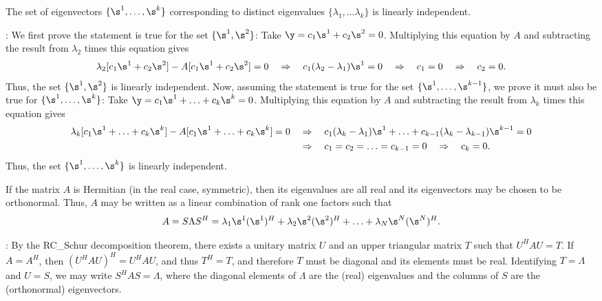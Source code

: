 \begin{fact} \label{fact.A.D.D.A}
The set of eigenvectors $\{\s^{1},\ldots,\s^{k}\}$ corresponding to
distinct eigenvalues $\{\lambda_{1},\ldots\lambda_{k}\}$ is linearly
independent.
\end{fact}

\/: We first prove the statement
is true for the set $\{\s^{1},\s^{2}\}$: Take
$\y=c_{1}\s^{1}+c_{2}\s^{2}=0$.  Multiplying this equation by $A$ and
subtracting the result from $\lambda_{2}$ times this equation gives
\begin{equation*}
    \lambda_{2}[c_{1}\s^{1}+c_{2}\s^{2}] - A[c_{1}\s^{1}+c_{2}\s^{2}] =0 \quad \Rightarrow \quad
    c_{1} (\lambda_{2}-\lambda_{1}) \s^{1} = 0 \quad \Rightarrow \quad c_{1}=0 \quad \Rightarrow \quad c_{2}=0.
\end{equation*}
Thus, the set $\{\s^{1},\s^{2}\}$ is linearly independent.  Now,
assuming the statement is true for the set
$\{\s^{1},\ldots,\s^{k-1}\}$, we prove it must also be true for
$\{\s^{1},\ldots,\s^{k}\}$: Take
$\y=c_{1}\s^{1}+\ldots+c_{k}\s^{k}=0$.  Multiplying this equation by
$A$ and subtracting the result from $\lambda_{k}$ times this equation
gives
\begin{align*}
    \lambda_{k}[c_{1}\s^{1}+\ldots+c_{k}\s^{k}] -
    A[c_{1}\s^{1}+\ldots+c_{k}\s^{k}] =0 \quad &\Rightarrow \quad c_{1}
    (\lambda_{k}-\lambda_{1}) \s^{1} + \ldots + c_{k-1}
    (\lambda_{k}-\lambda_{k-1}) \s^{k-1} = 0 \\ &\Rightarrow \quad
    c_{1}=c_{2}=\ldots=c_{k-1}=0 \quad \Rightarrow \quad c_{k}=0.
\end{align*}
Thus, the set $\{\s^{1},\ldots,\s^{k}\}$ is linearly independent. \endproof

\begin{fact} \label{fact.A.D.D.B}
If the matrix $A$ is Hermitian (in the real case,
symmetric), then its eigenvalues are all real and its eigenvectors may be
chosen to be orthonormal.  Thus, $A$ may be written as a linear combination of rank one
factors such that
\begin{equation*}
A=S\Lambda S^H = \lambda_1 \s^1 (\s^1)^H + \lambda_2 \s^2 (\s^2)^H + \ldots + \lambda_N \s^N (\s^N)^H.
\end{equation*}
\end{fact}

\/: By the RC_Schur decomposition theorem, there
exists a unitary matrix $U$ and an upper triangular matrix $T$ such
that $U^{H}AU=T$.  If $A=A^{H}$, then $(U^{H}AU)^{H}=U^{H}AU$, and
thus $T^{H}=T$, and therefore $T$ must be diagonal and its elements
must be real.  Identifying $T=\Lambda$ and $U=S$, we may write
$S^{H}A S=\Lambda$, where the diagonal elements of $\Lambda$ are the
(real) eigenvalues and the columns of $S$ are the (orthonormal)
eigenvectors.   \endproof

